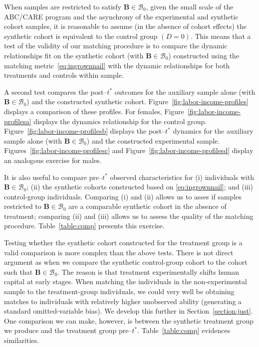 When samples are restricted to satisfy $\bm{B} \in \mathcal{B}_0$, given the small scale of the ABC/CARE program and the asynchrony of the experimental and synthetic cohort samples, it is reasonable to assume (in the absence of cohort effects) the synthetic cohort is equivalent to the control group $(D=0)$. This means that a test of the validity of our matching procedure is to compare the dynamic relationships fit on the synthetic cohort (with $\bm{B} \in \mathcal{B}_0$) constructed using the matching metric~\eqref{eq:ingrownnail} with the dynamic relationships for both treatments and controls within sample. 

A second test compares the post--$t^*$ outcomes for the auxiliary sample alone (with $\bm{B} \in \mathcal{B}_0$) and the constructed synthetic cohort. Figure~\ref{fig:labor-income-profiles} displays a comparison of these profiles. For females, Figure~\ref{fig:labor-income-profilesa} displays the dynamics relationship for the control group. Figure~\ref{fig:labor-income-profilesb} displays the post--$t^*$ dynamics for the auxiliary sample alone (with $\bm{B} \in \mathcal{B}_0$) and the constructed experimental sample. Figures~\ref{fig:labor-income-profilesc} and Figure~\ref{fig:labor-income-profilesd} display an analogous exercise for males.

It is also useful to compare pre--$t^*$ observed characteristics for (i) individuals with $\bm{B} \in \mathcal{B}_0$; (ii) the synthetic cohorts constructed based on \eqref{eq:ingrownnail}; and (iii) control-group individuals. Comparing (i) and (ii) allows us to asses if samples restricted to $\bm{B} \in \mathcal{B}_0$ are a comparable synthetic cohort in the absence of treatment; comparing (ii) and (iii) allows us to assess the quality of the matching procedure. Table~\ref{table:comp} presents this exercise. 

Testing whether the synthetic cohort constructed for the treatment group is a valid comparison is more complex than the above tests. There is not direct argument as when we compare the synthetic control-group cohort to the cohort such that $\bm{B} \in \mathcal{B}_0$. The reason is that treatment experimentally shifts human capital at early stages. When matching the individuals in the non-experimental sample to the treatment-group individuals, we could very well be obtaining matches to individuals with relatively higher unobserved ability (generating a standard omitted-variable bias). We develop this further in Section~\ref{section:just}. One comparison we can make, however, is between the synthetic treatment group we produce and the treatment group pre--$t^*$. Table~\ref{table:comp} evidences similarities. 

